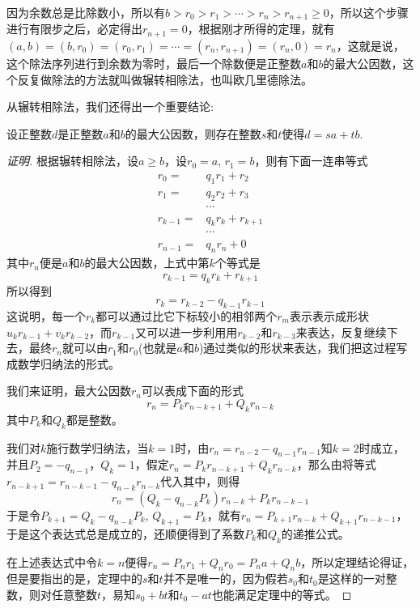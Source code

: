 因为余数总是比除数小，所以有$b > r_0 > r_1 > \cdots > r_n > r_{n+1} \geqslant 0$，所以这个步骤进行有限步之后，必定得出$r_{n+1}=0$，根据刚才所得的定理，就有$(a,b)=(b,r_0)=(r_0,r_1)=\cdots=(r_n, r_{n+1})=(r_n,0)=r_n$，这就是说，这个除法序列进行到余数为零时，最后一个除数便是正整数$a$和$b$的最大公因数，这个反复做除法的方法就叫做辗转相除法，也叫欧几里德除法。

从辗转相除法，我们还得出一个重要结论:
\begin{theorem}
  设正整数$d$是正整数$a$和$b$的最大公因数，则存在整数$s$和$t$使得$d=sa+tb$.
\end{theorem}

\begin{proof}[证明]
  根据辗转相除法，设$a \geqslant b$，设$r_0=a$, $r_1=b$，则有下面一连串等式
  \begin{align*}
    r_0 ={}  & q_1r_1 + r_2 \\
    r_1 ={} & q_2r_2 + r_3 \\
    & \cdots \\
    r_{k-1} ={} & q_kr_k + r_{k+1} \\
             & \cdots \\
    r_{n-1} ={} & q_nr_n + 0
  \end{align*}
  其中$r_n$便是$a$和$b$的最大公因数，上式中第$k$个等式是
  \[ r_{k-1} = q_kr_k + r_{k+1} \]
  所以得到
  \[ r_k = r_{k-2}-q_{k-1}r_{k-1} \]
  这说明，每一个$r_k$都可以通过比它下标较小的相邻两个$r_m$表示表示成形状$u_kr_{k-1}+v_kr_{k-2}$，而$r_{k-1}$又可以进一步利用用$r_{k-2}$和$r_{k-3}$来表达，反复继续下去，最终$r_n$就可以由$r_1$和$r_0$(也就是$a$和$b$)通过类似的形状来表达，我们把这过程写成数学归纳法的形式。

  我们来证明，最大公因数$r_n$可以表成下面的形式
  \[ r_n = P_kr_{n-k+1}+Q_kr_{n-k} \]
  其中$P_k$和$Q_k$都是整数。

  我们对$k$施行数学归纳法，当$k=1$时，由$r_n=r_{n-2}-q_{n-1}r_{n-1}$知$k=2$时成立，并且$P_2=-q_{n-1}$，$Q_k=1$，假定$r_n=P_kr_{n-k+1}+Q_kr_{n-k}$，那么由将等式$r_{n-k+1}=r_{n-k-1}-q_{n-k}r_{n-k}$代入其中，则得
  \[ r_n = (Q_k-q_{n-k}P_k)r_{n-k}+P_kr_{n-k-1} \]
  于是令$P_{k+1}=Q_k-q_{n-k}P_k$, $Q_{k+1}=P_k$，就有$r_n=P_{k+1}r_{n-k}+Q_{k+1}r_{n-k-1}$，于是这个表达式总是成立的，还顺便得到了系数$P_k$和$Q_k$的递推公式。

  在上述表达式中令$k=n$便得$r_n=P_nr_1+Q_nr_0=P_na+Q_nb$，所以定理结论得证，但是要指出的是，定理中的$s$和$t$并不是唯一的，因为假若$s_0$和$t_0$是这样的一对整数，则对任意整数$t$，易知$s_0+bt$和$t_0-at$也能满足定理中的等式。
\end{proof}

